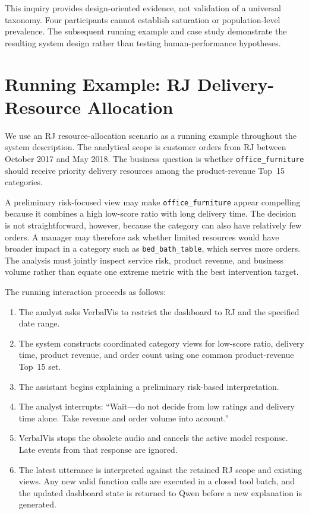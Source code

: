 \documentclass[journal]{IEEEtran}
\begin{document}
This inquiry provides design-oriented evidence, not validation of a universal taxonomy. Four participants cannot establish saturation or population-level prevalence. The subsequent running example and case study demonstrate the resulting system design rather than testing human-performance hypotheses.

\section{Running Example: RJ Delivery-Resource Allocation}
\label{sec:running-example}

We use an RJ resource-allocation scenario as a running example throughout the system description. The analytical scope is customer orders from RJ between October 2017 and May 2018. The business question is whether \texttt{office\_furniture} should receive priority delivery resources among the product-revenue Top~15 categories.

A preliminary risk-focused view may make \texttt{office\_furniture} appear compelling because it combines a high low-score ratio with long delivery time. The decision is not straightforward, however, because the category can also have relatively few orders. A manager may therefore ask whether limited resources would have broader impact in a category such as \texttt{bed\_bath\_table}, which serves more orders. The analysis must jointly inspect service risk, product revenue, and business volume rather than equate one extreme metric with the best intervention target.

The running interaction proceeds as follows:

\begin{enumerate}
\item The analyst asks VerbalVis to restrict the dashboard to RJ and the specified date range.
\item The system constructs coordinated category views for low-score ratio, delivery time, product revenue, and order count using one common product-revenue Top~15 set.
\item The assistant begins explaining a preliminary risk-based interpretation.
\item The analyst interrupts: ``Wait---do not decide from low ratings and delivery time alone. Take revenue and order volume into account.''
\item VerbalVis stops the obsolete audio and cancels the active model response. Late events from that response are ignored.
\item The latest utterance is interpreted against the retained RJ scope and existing views. Any new valid function calls are executed in a closed tool batch, and the updated dashboard state is returned to Qwen before a new explanation is generated.
\end{enumerate}
\end{document}
